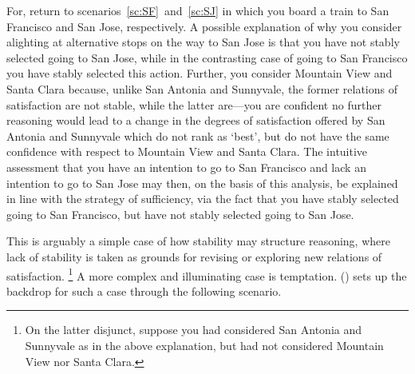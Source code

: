 \documentclass[10pt]{article}
\begin{document}
For, return to scenarios~\ref{sc:SF}~and~\ref{sc:SJ} in which you board a train to San Francisco and San Jose, respectively.
A possible explanation of why you consider alighting at alternative stops on the way to San Jose is that you have not stably selected going to San Jose, while in the contrasting case of going to San Francisco you have stably selected this action.
Further, you consider Mountain View and Santa Clara because, unlike San Antonia and Sunnyvale, the former relations of satisfaction are not stable, while the latter are---you are confident no further reasoning would lead to a change in the degrees of satisfaction offered by San Antonia and Sunnyvale which do not rank as `best', but do not have the same confidence with respect to Mountain View and Santa Clara.
The intuitive assessment that you have an intention to go to San Francisco and lack an intention to go to San Jose may then, on the basis of this analysis, be explained in line with the strategy of sufficiency, via the fact that you have stably selected going to San Francisco, but have not stably selected going to San Jose.

This is arguably a simple case of how stability may structure reasoning, where lack of stability is taken as grounds for revising or exploring new relations of satisfaction.\nolinebreak
\footnote{On the latter disjunct, suppose you had considered San Antonia and Sunnyvale as in the above explanation, but had not considered Mountain View nor Santa Clara.}
A more complex and illuminating case is temptation.
\citeauthor{Bratman:2007ab} (\citeyear{Bratman:2007ab}) sets up the backdrop for such a case through the following scenario.
\end{document}
